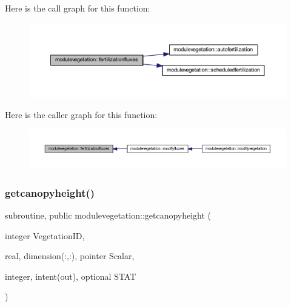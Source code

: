 Here is the call graph for this function\+:\nopagebreak
\begin{figure}[H]
\begin{center}
\leavevmode
\includegraphics[width=350pt]{namespacemodulevegetation_a045ff1bdd58f618fc041e85a712080d6_cgraph}
\end{center}
\end{figure}
Here is the caller graph for this function\+:\nopagebreak
\begin{figure}[H]
\begin{center}
\leavevmode
\includegraphics[width=350pt]{namespacemodulevegetation_a045ff1bdd58f618fc041e85a712080d6_icgraph}
\end{center}
\end{figure}
\mbox{\label{namespacemodulevegetation_af38b12fb3f6aba5eaf0e0153c1a5cf5b}} 
\subsubsection{\texorpdfstring{getcanopyheight()}{getcanopyheight()}}
{\footnotesize\ttfamily subroutine, public modulevegetation\+::getcanopyheight (\begin{DoxyParamCaption}\item[{integer}]{Vegetation\+ID,  }\item[{real, dimension(\+:,\+:), pointer}]{Scalar,  }\item[{integer, intent(out), optional}]{S\+T\+AT }\end{DoxyParamCaption})}

